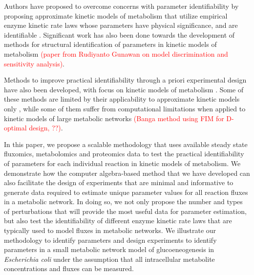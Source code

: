 \documentclass[10pt]{article}
\begin{document}
	Authors have proposed to overcome concerns with parameter identifiability by proposing approximate kinetic models of metabolism that utilize empirical enzyme kinetic rate laws whose parameters have physical significance, and are identifiable \parencite{Heijnen2005,Smallbone2007}. Significant work has also been done towards the development of methods for structural identification of parameters in kinetic models of metabolism \parencite{Ljung1994,Nikerel2009,Berthoumieux2013,Raue2014}\textcolor{red}{(paper from Rudiyanto Gunawan on model discrimination and sensitivity analysis)}.	
	
	Methods to improve practical identifiability through a priori experimental design have also been developed, with focus on kinetic models of metabolism \parencite{Gadkar2005a,Vanlier2014a,Raue2014}. Some of these methods are limited by their applicability to approximate kinetic models only \parencite{Nikerel2009,Berthoumieux2013}, while some of them suffer from computational limitations when applied to kinetic models of large metabolic networks \parencite{Gadkar2005a,Raue2014}\textcolor{red}{(Banga method using FIM for D-optimal design, ??)}. 	
	
	In this paper, we propose a scalable methodology that uses available steady state fluxomics, metabolomics and proteomics data to test the practical identifiability of parameters for each individual reaction in kinetic models of metabolism. We demonstrate how the computer algebra-based method that we have developed can also facilitate the design of experiments that are minimal and informative to generate data required to estimate unique parameter values for all reaction fluxes in a metabolic network. In doing so, we not only propose the number and types of perturbations that will provide the most useful data for parameter estimation, but also test the identifiability of different enzyme kinetic rate laws that are typically used to model fluxes in metabolic networks. We illustrate our methodology to identify parameters and design experiments to identify parameters in a small metabolic network model of glucoeneogenesis in \textit{Escherichia coli} \parencite{Kotte2014, Srinivasan2017} under the assumption that all intracellular metabolite concentrations and fluxes can be measured. 
	
	
 
\end{document}
